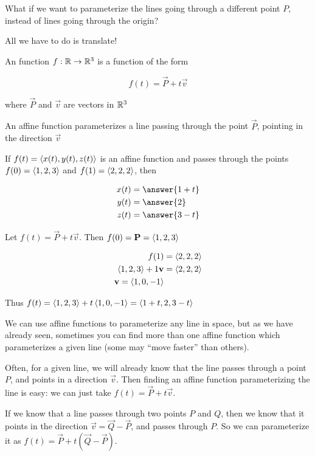 \documentclass{ximera}
\begin{document}
What if we want to parameterize the lines going through a different point $P$, instead of lines going through the origin?

All we have to do is translate!

\begin{definition}
	An  function $f:\mathbb R \to \mathbb R^3$ is a function of the form
	
	\[
		f(t) = \vec{P}+t\vec{v}
	\]
	
	where $\vec{P}$ and $\vec{v}$ are vectors in $\mathbb R^3$
\end{definition}

An affine function parameterizes a line passing through the point $\vec{P}$, pointing in the direction $\vec{v}$

\begin{question}
	If $f(t) = \left\langle x(t),y(t),z(t)\right\rangle$ is an affine function and passes through the points $f(0) = \left\langle 1,2,3\right\rangle$ and $f(1) = \left\langle 2,2,2\right\rangle$, then
	
	\begin{align*}
		x(t) &= \answer{1+t}\\
		y(t) &= \answer{2}\\
		z(t) &= \answer{3-t}
	\end{align*}
	
	\begin{hint}
		Let $f(t) = \vec{P}+t\vec{v}$.  Then $f(0) = \mathbf{P} = \left\langle 1,2,3\right\rangle$
	\end{hint}
	
	\begin{hint}
		\begin{align*}
			f(1) &= \left\langle 2,2,2\right\rangle\\
			\left\langle 1,2,3\right\rangle+1\mathbf{v} &= \left\langle 2,2,2\right\rangle\\
			\mathbf{v} = \left\langle 1,0,-1\right\rangle
		\end{align*}
	\end{hint}
	
	\begin{hint}
		Thus $f(t) = \left\langle 1,2,3\right\rangle+t\left\langle 1,0,-1\right\rangle = \left\langle 1+t,2,3-t\right\rangle$
	\end{hint}
\end{question}

\begin{explanation}
	We can use affine functions to parameterize any line in space, but as we have already seen, sometimes you can find more than one affine function which parameterizes a given line (some may ``move faster'' than others).
	
	Often, for a given line, we will already know that the line passes through a point $P$, and points in a direction $\vec{v}$.  Then finding an affine function parameterizing the line is easy:  we can just take $f(t) = \vec{P}+t\vec{v}$.
	
	If we know that a line passes through two points $P$ and $Q$, then we know that it points in the direction $\vec{v} = \vec{Q} - \vec{P}$, and passes through $P$.  So we can parameterize it as $f(t) = \vec{P}+t(\vec{Q} - \vec{P})$.
\end{explanation}
	
\end{document}
